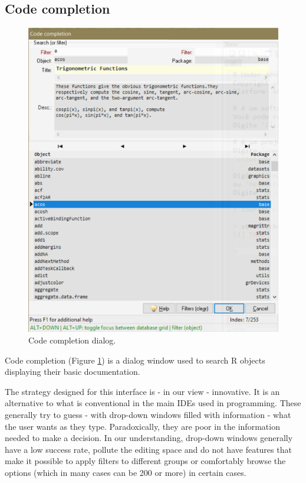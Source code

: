 \hypertarget{dlg_additional_dialogs_code_completion}{}
\subsection{Code completion}

\begin{figure}[H]
  \begin{center}
    \includegraphics[scale=0.8]{./res/dlg_code_completion.png}
  \end{center}
  \caption{Code completion dialog.}
  \label{fig:dlg_tinn-r_code_completion}
\end{figure}
Code completion
(Figure \ref{fig:dlg_tinn-r_code_completion})
is a dialog window used to search R objects displaying their basic documentation.

The strategy designed for this interface is - in our view - innovative. It is an alternative to what
is conventional in the main IDEs used in programming. These generally try to
guess - with drop-down windows filled with information - what the user wants as they type.
Paradoxically, they are poor in the information needed to make a decision.
In our understanding, drop-down windows generally have a low success rate,
pollute the editing space and do not have features that make it possible to apply filters to
different groups or comfortably browse the options (which in many cases can be 200 or more) in certain cases.

